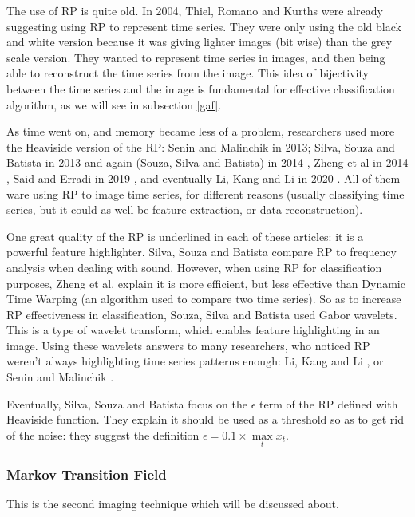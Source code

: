 \documentclass[11pt]{article}
\begin{document}
\begin{onehalfspace}
The use of RP is quite old. In 2004, Thiel, Romano and Kurths \cite{thiel} were already suggesting using RP to represent time series. They were only using the old black and white version because it was giving lighter images (bit wise) than the grey scale version. They wanted to represent time series in images, and then being able to reconstruct the time series from the image. This idea of bijectivity between the time series and the image is fundamental for effective classification algorithm, as we will see in subsection \ref{gaf}. 

As time went on, and memory became less of a problem, researchers used more the Heaviside version of the RP: Senin and Malinchik in 2013; Silva, Souza and Batista in 2013 \cite{silva} and again (Souza, Silva and Batista) in 2014 \cite{souza}, Zheng et al in 2014 \cite{zheng}, Said and Erradi in 2019 \cite{senin}, and eventually Li, Kang and Li in 2020 \cite{li}. All of them ware using RP to image time series, for different reasons (usually classifying time series, but it could as well be feature extraction, or data reconstruction).

One great quality of the RP is underlined in each of these articles: it is a powerful feature highlighter. Silva, Souza and Batista \cite{silva} compare RP to frequency analysis when dealing with sound. However, when using RP for classification purposes, Zheng et al. \cite{zheng} explain it is more efficient, but less effective than Dynamic Time Warping (an algorithm used to compare two time series). So as to increase RP effectiveness in classification, Souza, Silva and Batista \cite{souza} used Gabor wavelets. This is a type of wavelet transform, which enables feature highlighting in an image. Using these wavelets answers to many researchers, who noticed RP weren't always highlighting time series patterns enough: Li, Kang and Li \cite{li}, or Senin and Malinchik \cite{senin}. 

Eventually, Silva, Souza and Batista \cite{silva} focus on the $\epsilon$ term of the RP defined with Heaviside function. They explain it should be used as a threshold so as to get rid of the noise: they suggest the definition $\epsilon = 0.1 \times \max\limits_t x_t$.

\subsubsection{Markov Transition Field}

This is the second imaging technique which will be discussed about. 


\end{onehalfspace}
\end{document}
